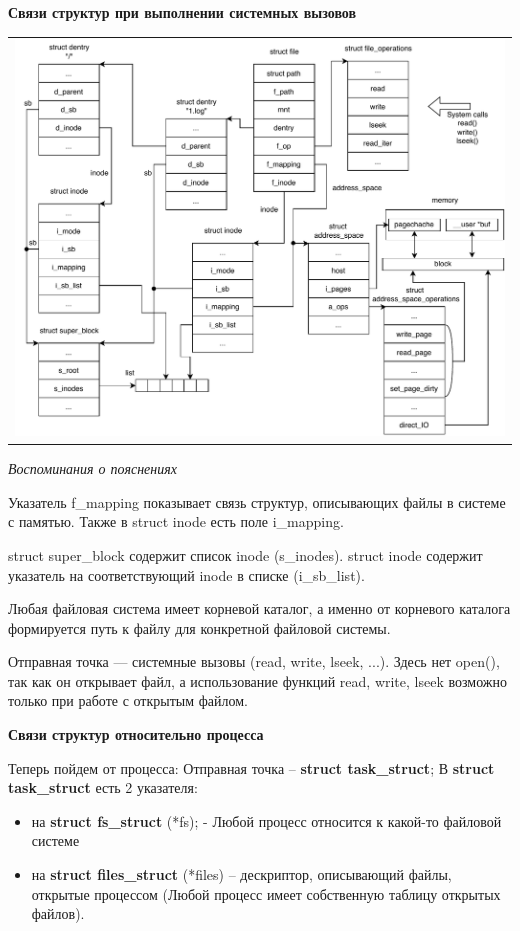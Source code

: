 \textbf{Связи структур при выполнении системных вызовов}
\begin{table}[H]
  \centering
  \begin{tabular}{p{1\linewidth}}
    \centering
    \includegraphics[width=0.8\linewidth]{./images/systemcalls_connect.pdf}
  \end{tabular}
\end{table}

\textit{Воспоминания о пояснениях}

Указатель f\_mapping показывает связь структур, описывающих файлы в системе с памятью. Также в struct inode есть поле i\_mapping.

struct super\_block содержит список inode (s\_inodes). struct inode содержит указатель на соответствующий inode в списке (i\_sb\_list).

Любая файловая система имеет корневой каталог, а именно от корневого каталога формируется путь к файлу для конкретной файловой системы.

Отправная точка — системные вызовы (read, write, lseek, ...). Здесь нет open(), так как он открывает файл, а использование функций read, write, lseek возможно только при работе с открытым файлом.

\textbf{Связи структур относительно процесса}
\par Теперь пойдем от процесса: Отправная точка -- \textbf{struct task\_struct};
В \textbf{struct task\_struct} есть 2 указателя: 
\begin{itemize}
\item на \textbf{struct fs\_struct} (*fs); - Любой процесс относится к какой-то файловой системе
\item на \textbf{struct files\_struct} (*files) -- дескриптор, описывающий файлы, открытые процессом (Любой процесс имеет собственную таблицу открытых файлов).
\end{itemize}

